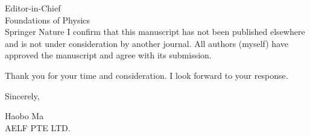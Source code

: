 \documentclass[11pt]{letter}
\begin{document}
\begin{letter}{Editor-in-Chief \\ Foundations of Physics \\ Springer Nature}
I confirm that this manuscript has not been published elsewhere and is not under consideration by another journal. All authors (myself) have approved the manuscript and agree with its submission.

Thank you for your time and consideration. I look forward to your response.

\closing{Sincerely,}

Haobo Ma \\
AELF PTE LTD.

\end{letter}
\end{document}
